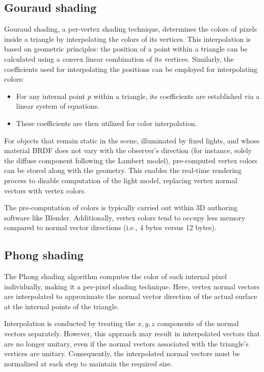 \subsection{Gouraud shading}
Gouraud shading, a per-vertex shading technique, determines the colors of pixels inside a triangle by interpolating the colors of its vertices. 
This interpolation is based on geometric principles: the position of a point within a triangle can be calculated using a convex linear combination of its vertices. 
Similarly, the coefficients used for interpolating the positions can be employed for interpolating colors:
\begin{itemize}
    \item For any internal point $p$ within a triangle, its coefficients are established via a linear system of equations.
    \item These coefficients are then utilized for color interpolation.
\end{itemize}
For objects that remain static in the scene, illuminated by fixed lights, and whose material BRDF does not vary with the observer's direction (for instance, solely the diffuse component following the Lambert model), pre-computed vertex colors can be stored along with the geometry. 
This enables the real-time rendering process to disable computation of the light model, replacing vertex normal vectors with vertex colors.

The pre-computation of colors is typically carried out within 3D authoring software like Blender. 
Additionally, vertex colors tend to occupy less memory compared to normal vector directions (i.e., 4 bytes versus 12 bytes).


\subsection{Phong shading}
The Phong shading algorithm computes the color of each internal pixel individually, making it a per-pixel shading technique. 
Here, vertex normal vectors are interpolated to approximate the normal vector direction of the actual surface at the internal points of the triangle.

Interpolation is conducted by treating the $x, y, z$ components of the normal vectors separately. 
However, this approach may result in interpolated vectors that are no longer unitary, even if the normal vectors associated with the triangle's vertices are unitary. 
Consequently, the interpolated normal vectors must be normalized at each step to maintain the required size.

